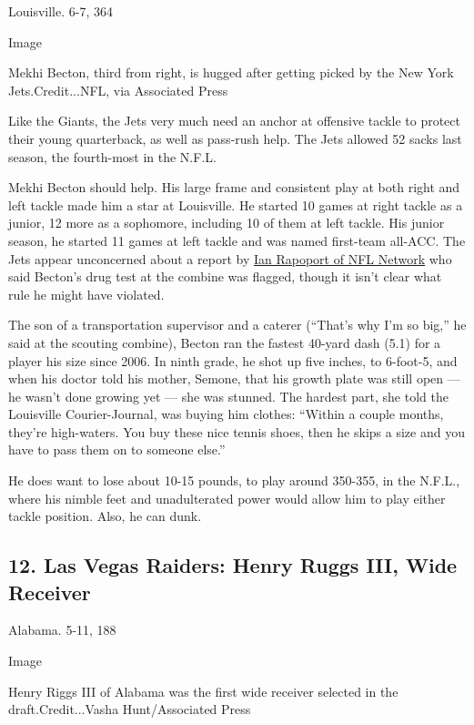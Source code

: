 Louisville. 6-7, 364

Image

Mekhi Becton, third from right, is hugged after getting picked by the
New York Jets.Credit...NFL, via Associated Press

Like the Giants, the Jets very much need an anchor at offensive tackle
to protect their young quarterback, as well as pass-rush help. The Jets
allowed 52 sacks last season, the fourth-most in the N.F.L.

Mekhi Becton should help. His large frame and consistent play at both
right and left tackle made him a star at Louisville. He started 10 games
at right tackle as a junior, 12 more as a sophomore, including 10 of
them at left tackle. His junior season, he started 11 games at left
tackle and was named first-team all-ACC. The Jets appear unconcerned
about a report by
\href{https://twitter.com/RapSheet/status/1251315257097596928}{Ian
Rapoport of NFL Network} who said Becton's drug test at the combine was
flagged, though it isn't clear what rule he might have violated.

The son of a transportation supervisor and a caterer (``That's why I'm
so big,'' he said at the scouting combine), Becton ran the fastest
40-yard dash (5.1) for a player his size since 2006. In ninth grade, he
shot up five inches, to 6-foot-5, and when his doctor told his mother,
Semone, that his growth plate was still open --- he wasn't done growing
yet --- she was stunned. The hardest part, she told the Louisville
Courier-Journal, was buying him clothes: ``Within a couple months,
they're high-waters. You buy these nice tennis shoes, then he skips a
size and you have to pass them on to someone else.''

He does want to lose about 10-15 pounds, to play around 350-355, in the
N.F.L., where his nimble feet and unadulterated power would allow him to
play either tackle position. Also, he can dunk.

\hypertarget{12-las-vegas-raiders-henry-ruggs-iii-wide-receiver}{%
\subsection{12. Las Vegas Raiders: Henry Ruggs III, Wide
Receiver}\label{12-las-vegas-raiders-henry-ruggs-iii-wide-receiver}}

Alabama. 5-11, 188

Image

Henry Riggs III of Alabama was the first wide receiver selected in the
draft.Credit...Vasha Hunt/Associated Press

